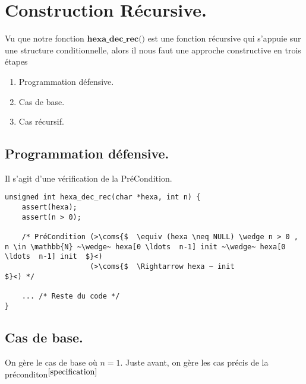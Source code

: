 \documentclass[a4paper, 11pt, oneside]{article}
\newcommand{\coms}[1]{\textcolor{MidnightBlue}{#1}}
\begin{document}
\newpage

\section{Construction Récursive.}\label{recur}

	Vu que notre fonction $\textbf{hexa\_dec\_rec()}$ est une fonction récursive qui s'appuie sur une structure conditionnelle, 
	alors il nous faut une approche constructive en trois étapes
	
	\begin{enumerate}
		\item Programmation défensive.
		\item Cas de base.
		\item Cas récursif.
	\end{enumerate} 
	
	\subsection{Programmation défensive.}
	
		Il s'agit d'une vérification de la PréCondition.

		\begin{lstlisting}[caption={hexa\_dec\_rec()}]
unsigned int hexa_dec_rec(char *hexa, int n) {
	assert(hexa);
	assert(n > 0);

    /* PréCondition (>\coms{$  \equiv (hexa \neq NULL) \wedge n > 0 , n \in \mathbb{N} ~\wedge~ hexa[0 \ldots  n-1] init ~\wedge~ hexa[0 \ldots  n-1] init 	$}<)
					(>\coms{$  \Rightarrow hexa ~ init 																										$}<) */
	
	... /* Reste du code */
}

		\end{lstlisting}
		
	\subsection{Cas de base.}\label{cas_base_code}
	
	
	On gère le cas de base où $n = 1$. Juste avant, on gère les cas précis de la préconditon$^{\ref{specification}}$
	
\end{document}
